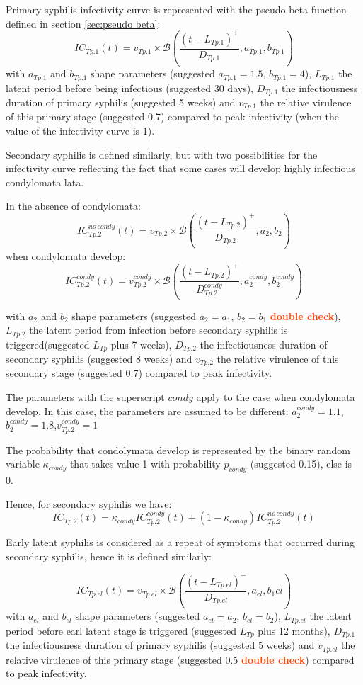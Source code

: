 \documentclass[11pt, onecolumn]{article}
\newcommand{\warning}[1]{\textbf{\textcolor{OrangeRed}{#1}}}
\begin{document}
Primary syphilis infectivity curve is represented with the pseudo-beta function defined in section \ref{sec:pseudo beta}:
$$IC_{Tp.1}(t) = v_{Tp.1}\times\mathcal{B} \left(\frac{(t-L_{Tp.1})^
+}{D_{Tp.1}}, a_{Tp.1},b_{Tp.1} \right) $$
with $a_{Tp.1}$ and $b_{Tp.1}$ shape parameters (suggested $a_{Tp.1}=1.5$, $b_{Tp.1} = 4$), $L_{Tp.1}$ the latent period before being infectious (suggested 30 days), $D_{Tp.1}$ the infectiousness duration of primary syphilis (suggested 5 weeks) and $v_{Tp.1}$ the relative virulence of this primary stage (suggested 0.7) compared to peak infectivity (when the value of the infectivity curve is 1).

Secondary syphilis is defined similarly, but with two possibilities for the infectivity curve reflecting the fact that some cases will develop highly infectious condylomata lata.

In the absence of condylomata:
$$IC_{Tp.2}^{no\,condy}(t) = v_{Tp.2}\times\mathcal{B} \left(\frac{(t-L_{Tp.2})^
+}{D_{Tp.2}}, a_2,b_2 \right) $$
when condylomata develop:
$$IC_{Tp.2}^{condy}(t) = v_{Tp.2}^{condy}\times\mathcal{B} \left(\frac{(t-L_{Tp.2})^
+}{D_{Tp.2}^{condy}}, a_2^{condy},b_2^{condy} \right) $$

with $a_2$ and $b_2$ shape parameters (suggested $a_2=a_1$, $b_2 = b_1$ \warning{double check}), $L_{Tp.2}$ the latent period from infection before secondary syphilis is triggered(suggested $L_{Tp}$ plus 7 weeks), $D_{Tp.2}$ the infectiousness duration of secondary syphilis (suggested 8 weeks) and $v_{Tp.2}$ the relative virulence of this secondary stage (suggested 0.7) compared to peak infectivity. 

The parameters with the superscript $condy$ apply to the case when condylomata develop. In this case, the parameters are assumed to be different:  $a_2^{condy}=1.1$, $b_2^{condy}=1.8$,$ v_{Tp.2}^{condy}=1$

The probability that condolymata develop is represented by the binary random variable $\kappa_{condy}$ that takes value 1 with probability $p_{condy}$ (suggested 0.15), else is 0.

Hence, for secondary syphilis we have:
$$IC_{Tp.2}(t)  = \kappa_{condy}IC_{Tp.2}^{condy}(t) +(1-\kappa_{condy})IC_{Tp.2}^{no\,condy}(t) $$

Early latent syphilis is considered as a repeat of symptoms that occurred during secondary syphilis, hence it is defined similarly:

$$IC_{Tp.el}(t) = v_{Tp.el}\times\mathcal{B} \left(\frac{(t-L_{Tp.el})^
+}{D_{Tp.el}}, a_{el},b_1{el} \right) $$
with $a_{el}$ and $b_{el}$ shape parameters (suggested $a_{el}=a_2$, $b_{el} = b_2$), $L_{Tp.el}$ the latent period before earl latent stage is triggered (suggested $L_{Tp}$ plus 12 months), $D_{Tp.1}$ the infectiousness duration of primary syphilis (suggested 5 weeks) and $v_{Tp.el}$ the relative virulence of this primary stage (suggested 0.5 \warning{double check}) compared to peak infectivity.
\end{document}
